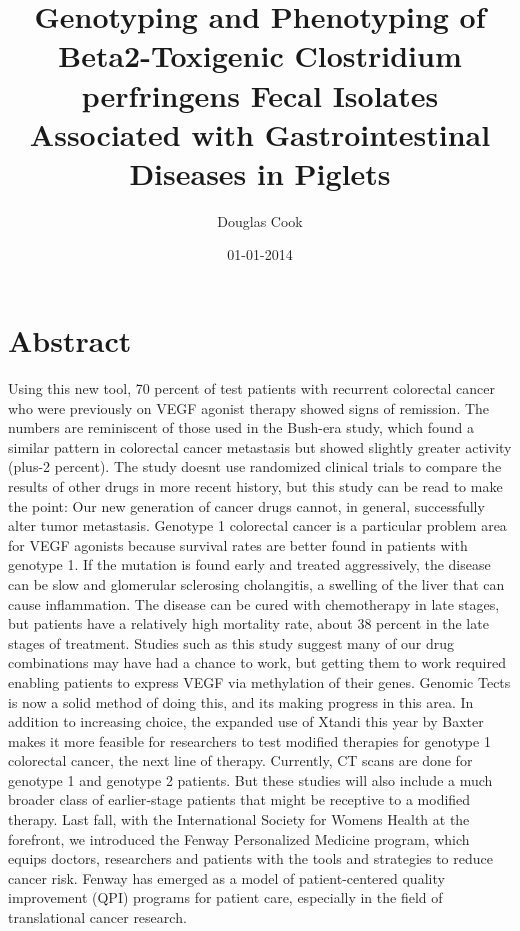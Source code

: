 \documentclass{article}%
\title{Genotyping and Phenotyping of Beta2{-}Toxigenic Clostridium perfringens Fecal Isolates Associated with Gastrointestinal Diseases in Piglets}%
\author{Douglas Cook}%
\affil{Department of Biology, Pamukkale University, Kinikli Campus, 20070 Denizli, Turkey}%
\date{01{-}01{-}2014}%
\begin{document}
%
\normalsize%
\maketitle%
\section{Abstract}%
\label{sec:Abstract}%
Using this new tool, 70 percent of test patients with recurrent colorectal cancer who were previously on VEGF agonist therapy showed signs of remission.\newline%
The numbers are reminiscent of those used in the Bush{-}era study, which found a similar pattern in colorectal cancer metastasis but showed slightly greater activity (plus{-}2 percent). The study doesnt use randomized clinical trials to compare the results of other drugs in more recent history, but this study can be read to make the point: Our new generation of cancer drugs cannot, in general, successfully alter tumor metastasis.\newline%
Genotype 1 colorectal cancer is a particular problem area for VEGF agonists because survival rates are better found in patients with genotype 1. If the mutation is found early and treated aggressively, the disease can be slow and glomerular sclerosing cholangitis, a swelling of the liver that can cause inflammation. The disease can be cured with chemotherapy in late stages, but patients have a relatively high mortality rate, about 38 percent in the late stages of treatment.\newline%
Studies such as this study suggest many of our drug combinations may have had a chance to work, but getting them to work required enabling patients to express VEGF via methylation of their genes. Genomic Tects is now a solid method of doing this, and its making progress in this area.\newline%
In addition to increasing choice, the expanded use of Xtandi this year by Baxter makes it more feasible for researchers to test modified therapies for genotype 1 colorectal cancer, the next line of therapy. Currently, CT scans are done for genotype 1 and genotype 2 patients. But these studies will also include a much broader class of earlier{-}stage patients that might be receptive to a modified therapy.\newline%
Last fall, with the International Society for Womens Health at the forefront, we introduced the Fenway Personalized Medicine program, which equips doctors, researchers and patients with the tools and strategies to reduce cancer risk. Fenway has emerged as a model of patient{-}centered quality improvement (QPI) programs for patient care, especially in the field of translational cancer research.\newline%
\end{document}
